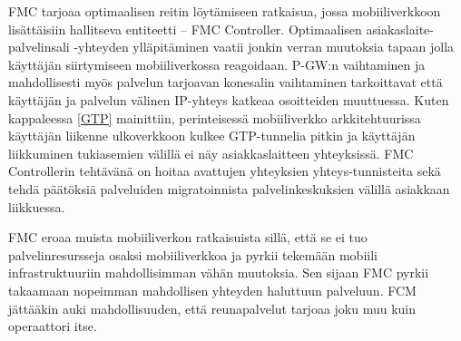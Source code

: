 FMC tarjoaa optimaalisen reitin löytämiseen ratkaisua, jossa mobiiliverkkoon lisättäisiin hallitseva entiteetti – FMC Controller. 
Optimaalisen asiakaslaite-palvelinsali -yhteyden ylläpitäminen vaatii jonkin verran muutoksia tapaan jolla käyttäjän siirtymiseen mobiiliverkossa reagoidaan. P-GW:n vaihtaminen ja mahdollisesti myös palvelun tarjoavan konesalin vaihtaminen tarkoittavat että käyttäjän ja palvelun välinen IP-yhteys katkeaa osoitteiden muuttuessa. Kuten kappaleessa \ref{GTP} mainittiin, perinteisessä mobiiliverkko arkkitehtuurissa käyttäjän liikenne ulkoverkkoon kulkee GTP-tunnelia pitkin ja käyttäjän liikkuminen tukiasemien välillä ei näy asiakkaslaitteen yhteyksissä. FMC Controllerin tehtävänä on hoitaa avattujen yhteyksien yhteys-tunnisteita sekä tehdä päätöksiä palveluiden migratoinnista palvelinkeskuksien välillä asiakkaan liikkuessa.

FMC eroaa muista mobiiliverkon ratkaisuista sillä, että se ei tuo palvelinresursseja osaksi mobiiliverkkoa ja pyrkii tekemään mobiili infrastruktuuriin mahdollisimman vähän muutoksia. Sen sijaan FMC pyrkii takaamaan nopeimman mahdollisen yhteyden haluttuun palveluun. FCM jättääkin auki mahdollisuuden, että reunapalvelut tarjoaa joku muu kuin operaattori itse.
